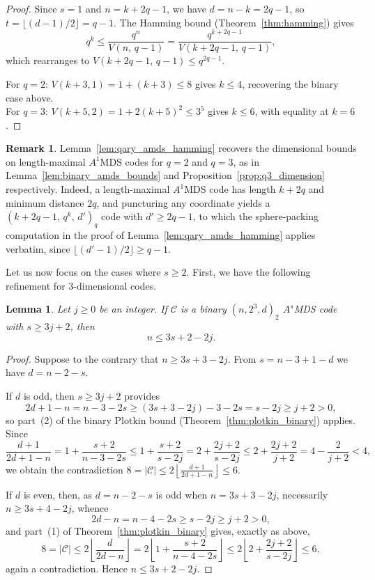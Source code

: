 \documentclass[12pt, letterpaper]{article}
\theoremstyle{plain}
\newtheorem{lemma}[theorem]{Lemma}
\theoremstyle{definition}
\newtheorem{remark}[theorem]{Remark}
\begin{document}
	\begin{proof}
		Since $s = 1$ and $n = k + 2q - 1$, we have $d = n - k = 2q - 1$, so $t = \lfloor (d-1)/2 \rfloor = q - 1$. The Hamming bound (Theorem~\ref{thm:hamming}) gives
		\[
		q^k \le \frac{q^n}{V(n,\, q-1)} = \frac{q^{k+2q-1}}{V(k+2q-1,\, q-1)},
		\]
		which rearranges to $V(k+2q-1,\, q-1) \le q^{2q-1}$.
		
		For $q = 2$: $V(k+3, 1) = 1 + (k+3) \le 8$ gives $k \le 4$, recovering the binary case above.\\
		For $q = 3$: $	V(k+5, 2) = 1 + 2(k+5)^2 \le 3^5$ gives $k \le 6$, with equality at $k=6$.
	\end{proof}

	\begin{remark}\label{rem:hamming_dimension_caps}
		Lemma~\ref{lem:qary_amds_hamming} recovers the dimensional bounds on length-maximal $A^1$MDS codes for $q=2$ and $q=3$, as in Lemma~\ref{lem:binary_amds_bounds} and Proposition~\ref{prop:q3_dimension} respectively. Indeed, a length-maximal $A^1$MDS code has length $k+2q$ and minimum distance $2q$, and puncturing any coordinate yields a $(k+2q-1,\, q^k,\, d')_q$ code with $d' \ge 2q-1$, to which the sphere-packing computation in the proof of Lemma~\ref{lem:qary_amds_hamming} applies verbatim, since $\lfloor (d'-1)/2 \rfloor \ge q-1$.
	\end{remark}

	Let us now focus on the cases where $s\ge 2$.  First, we have the following refinement for 3-dimensional codes.
	
	\begin{lemma}\label{lem:binary_refinement}
		Let $j \ge 0$ be an integer. If $\mathcal{C}$ is a binary $(n, 2^3, d)_2$ $A^s$MDS code with $s \ge 3j+2$, then
		\[
		n \le 3s + 2 - 2j.
		\]
	\end{lemma}
	
	\begin{proof}
		Suppose to the contrary that $n \ge 3s+3-2j$. From $s = n - 3 + 1 - d$ we have $d = n-2-s$.

		If $d$ is odd, then $s \ge 3j+2$ provides
		\[
		2d+1 - n = n - 3 - 2s \ge (3s+3-2j) - 3 - 2s = s - 2j \ge j+2 > 0,
		\]
		so part~(2) of the binary Plotkin bound (Theorem~\ref{thm:plotkin_binary}) applies. Since
		\[
		\frac{d+1}{2d+1-n} = 1 + \frac{s+2}{n-3-2s} \le 1 + \frac{s+2}{s-2j} = 2 + \frac{2j+2}{s-2j} \le 2 + \frac{2j+2}{j+2} = 4 - \frac{2}{j+2} < 4,
		\]
		we obtain the contradiction $8 = |\mathcal{C}| \le 2\left\lfloor\frac{d+1}{2d+1-n}\right\rfloor \le 6$.

		If $d$ is even, then, as $d = n-2-s$ is odd when $n = 3s+3-2j$, necessarily $n \ge 3s+4-2j$, whence
		\[
		2d - n = n - 4 - 2s \ge s - 2j \ge j+2 > 0,
		\]
		and part~(1) of Theorem~\ref{thm:plotkin_binary} gives, exactly as above,
		\[
		8 = |\mathcal{C}| \le 2\left\lfloor \frac{d}{2d-n} \right\rfloor = 2\left\lfloor 1 + \frac{s+2}{n-4-2s} \right\rfloor \le 2\left\lfloor 2 + \frac{2j+2}{s-2j} \right\rfloor \le 6,
		\]
		again a contradiction. Hence $n \le 3s+2-2j$.
	\end{proof}
\end{document}
